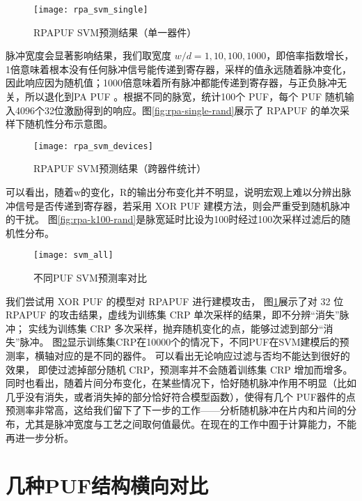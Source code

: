 \begin{figure}[htb!]
\centering
\texttt{[image: rpa\_svm\_single]}
\caption{RPAPUF SVM预测结果（单一器件）}
\label{fig:rpa-svm}
\end{figure}


脉冲宽度会显著影响结果，我们取宽度 $ w/d={1,10,100,1000} $，即倍率指数增长，1倍意味着根本没有任何脉冲信号能传递到寄存器，采样的值永远随着脉冲变化，因此响应因为随机值；1000倍意味着所有脉冲都能传递到寄存器，与正负脉冲无关，所以退化到PA PUF 。根据不同的脉宽，统计100个 PUF，每个 PUF 随机输入4096个32位激励得到的响应。图\ref{fig:rpa-single-rand}展示了 RPAPUF 的单次采样下随机性分布示意图。

\begin{figure}[htb!]
\centering
\texttt{[image: rpa\_svm\_devices]}
\caption{RPAPUF SVM预测结果（跨器件统计）}
\label{fig:rpa-svm-devices}
\end{figure}

可以看出，随着w的变化，R的输出分布变化并不明显，说明宏观上难以分辨出脉冲信号是否传递到寄存器，若采用 XOR PUF 建模方法，则会严重受到随机脉冲的干扰。
图\ref{fig:rpa-k100-rand}是脉宽延时比设为100时经过100次采样过滤后的随机性分布。

\begin{figure}[htb!]
\centering
\texttt{[image: svm\_all]}
\caption{不同PUF SVM预测率对比}
\label{fig:svm_all}
\end{figure}

我们尝试用 XOR PUF 的模型对 RPAPUF 进行建模攻击， 图\ref{fig:rpa-svm}展示了对 32 位 RPAPUF 的攻击结果，虚线为训练集 CRP 单次采样的结果，即不分辨``消失''脉冲；
实线为训练集 CRP 多次采样，抛弃随机变化的点，能够过滤到部分``消失''脉冲。
图\ref{fig:rpa-svm-devices}显示训练集CRP在10000个的情况下，不同PUF在SVM建模后的预测率，横轴对应的是不同的器件。
可以看出无论响应过滤与否均不能达到很好的效果， 即使过滤掉部分随机 CRP，预测率并不会随着训练集 CRP 增加而增多。
同时也看出，随着片间分布变化，在某些情况下，恰好随机脉冲作用不明显（比如几乎没有消失，或者消失掉的部分恰好符合模型函数），使得有几个 PUF器件的点预测率非常高，这给我们留下了下一步的工作——分析随机脉冲在片内和片间的分布，尤其是脉冲宽度与工艺之间取何值最优。在现在的工作中囿于计算能力，不能再进一步分析。



\section{几种PUF结构横向对比}\label{sec:rpa_summary}

